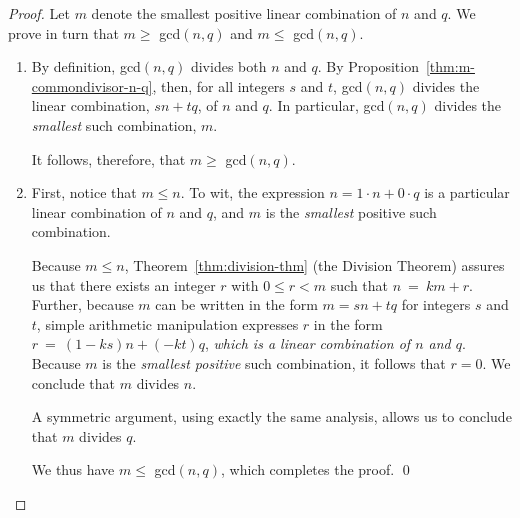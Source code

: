 \begin{proof}
Let $m$ denote the smallest positive linear combination of $n$ and $q$.  We prove in turn that $m \geq$ {\sc gcd}$(n, q)$ and $m \leq$ {\sc gcd}$(n, q)$. 
\begin{enumerate}
\item 
By definition, {\sc gcd}$(n, q)$ divides both $n$ and $q$.  By 
Proposition~\ref{thm:m-commondivisor-n-q}, then, for all integers $s$ and $t$, {\sc gcd}$(n, q)$ divides the linear combination, $s n +t q$, of $n$ and $q$.  In particular, {\sc gcd}$(n, q)$ divides the {\em smallest} such combination, $m$. 

\smallskip

It follows, therefore, that $m \geq$ {\sc gcd}$(n, q)$.
\item
First, notice that $m \leq n$.  To wit, the expression $n = 1 \cdot n + 0 \cdot q$ is a particular linear combination of $n$ and $q$, and $m$ is the {\em smallest} positive such combination.   

\smallskip

Because $m \leq n$, Theorem~\ref{thm:division-thm} (the Division Theorem) assures us that there exists an integer $r$ with $0 \leq r < m$ such that $n \ = \ k m + r$.  Further, because $m$ can be written in the form $m = s n+t q$ for integers $s$ and $t$, simple arithmetic manipulation expresses $r$ in the form $r \ = \ (1 - k s)n + (-k t)q$,  {\em which is a linear combination of $n$ and $q$}.  Because $m$ is the {\em smallest positive} such combination, it follows that $r=0$.  We conclude that $m$ divides $n$.

\smallskip

A symmetric argument, using exactly the same analysis, allows us to conclude that $m$ divides $q$.

\smallskip

We thus have $m \leq$ {\sc gcd}$(n, q)$, which completes the proof.  \qed
\end{enumerate}


\end{proof}
